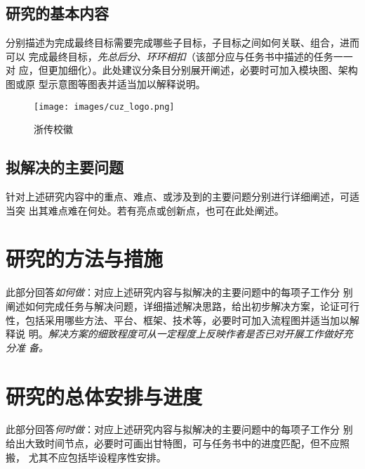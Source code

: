 \subsection{研究的基本内容}

\begin{tcolorbox}
	分别描述为完成最终目标需要完成哪些子目标，子目标之间如何关联、组合，进而可以
	完成最终目标，\emph{先总后分、环环相扣}（该部分应与任务书中描述的任务一一对
	应，但更加细化）。此处建议分条目分别展开阐述，必要时可加入模块图、架构图或原
	型示意图等图表并适当加以解释说明。
\end{tcolorbox}
\begin{figure}[h]
	\centering
	\texttt{[image: images/cuz\_logo.png]}
	\caption{浙传校徽}
	\label{fig:1}
\end{figure}

\subsection{拟解决的主要问题}

\begin{tcolorbox}
	针对上述研究内容中的重点、难点、或涉及到的主要问题分别进行详细阐述，可适当突
	出其难点难在何处。若有亮点或创新点，也可在此处阐述。
\end{tcolorbox}

\section{研究的方法与措施}

\begin{tcolorbox}
	此部分回答\emph{如何做}：对应上述研究内容与拟解决的主要问题中的每项子工作分
	别阐述如何完成任务与解决问题，详细描述解决思路，给出初步解决方案，论证可行
	性，包括采用哪些方法、平台、框架、技术等，必要时可加入流程图并适当加以解释说
	明。\emph{解决方案的细致程度可从一定程度上反映作者是否已对开展工作做好充分准
		备。}
\end{tcolorbox}

\section{研究的总体安排与进度}

\begin{tcolorbox}
	此部分回答\emph{何时做}：对应上述研究内容与拟解决的主要问题中的每项子工作分
	别给出大致时间节点，必要时可画出甘特图，可与任务书中的进度匹配，但不应照搬，
	尤其不应包括毕设程序性安排。
\end{tcolorbox}


